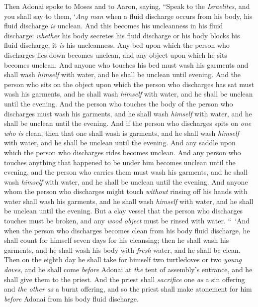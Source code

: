 \begin{biblechapter} %
 Then Adonai spoke to Moses and to Aaron, saying,
\verse “Speak to the \textit{Israelites}, and you shall say to them, ‘\textit{Any man} when a fluid discharge occurs from his body, his fluid discharge \textit{is} unclean.
\verse And this becomes his uncleanness in his fluid discharge: \textit{whether} his body secretes his fluid discharge or his body blocks his fluid discharge, it \textit{is} his uncleanness.
\verse Any bed upon which the person who discharges lies down becomes unclean, and any object upon which he sits becomes unclean.
\verse And anyone who touches his bed must wash his garments and shall wash \textit{himself} with water, and he shall be unclean until evening.
\verse And the person who sits on the object upon which the person who discharges has sat must wash his garments, and he shall wash \textit{himself} with water, and he shall be unclean until the evening.
\verse And the person who touches the body of the person who discharges must wash his garments, and he shall wash \textit{himself} with water, and he shall be unclean until the evening.
\verse And if the person who discharges spits on \textit{one who is} clean, then that one shall wash is garments, and he shall wash \textit{himself} with water, and he shall be unclean until the evening.
\verse And any saddle upon which the person who discharges rides becomes unclean.
\verse And any person who touches anything that happened to be under him becomes unclean until the evening, and the person who carries them must wash his garments, and he shall wash \textit{himself} with water, and he shall be unclean until the evening.
\verse And anyone whom the person who discharges might touch \textit{without} rinsing off his hands with water shall wash his garments, and he shall wash \textit{himself} with water, and he shall be unclean until the evening.
\verse But a clay vessel that the person who discharges touches must be broken, and any \textit{wood object} must be rinsed with water.
\verse “ ‘And when the person who discharges becomes clean from his body fluid discharge, he shall count for himself seven days for his cleansing; then he shall wash his garments, and he shall wash his body with \textit{fresh} water, and he shall be clean.
\verse Then on the eighth day he shall take for himself two turtledoves or two \textit{young doves}, and he shall come \textit{before} Adonai at \textit{the} tent of assembly’s entrance, and he shall give them to the priest.
\verse And the priest shall \textit{sacrifice} one \textit{as} a sin offering and \textit{the other} \textit{as} a burnt offering, and so the priest shall make atonement for him \textit{before} Adonai from his body fluid discharge.

\end{biblechapter}
